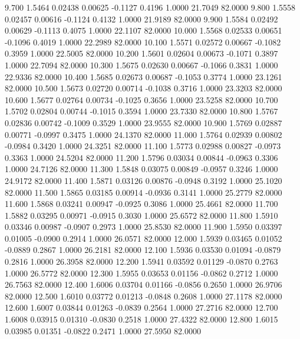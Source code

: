    9.700   1.5464   0.02438   0.00625  -0.1127   0.4196   1.0000  21.7049  82.0000
   9.800   1.5558   0.02457   0.00616  -0.1124   0.4132   1.0000  21.9189  82.0000
   9.900   1.5584   0.02492   0.00629  -0.1113   0.4075   1.0000  22.1107  82.0000
  10.000   1.5568   0.02533   0.00651  -0.1096   0.4019   1.0000  22.2989  82.0000
  10.100   1.5571   0.02572   0.00667  -0.1082   0.3959   1.0000  22.5005  82.0000
  10.200   1.5601   0.02604   0.00673  -0.1071   0.3897   1.0000  22.7094  82.0000
  10.300   1.5675   0.02630   0.00667  -0.1066   0.3831   1.0000  22.9336  82.0000
  10.400   1.5685   0.02673   0.00687  -0.1053   0.3774   1.0000  23.1261  82.0000
  10.500   1.5673   0.02720   0.00714  -0.1038   0.3716   1.0000  23.3203  82.0000
  10.600   1.5677   0.02764   0.00734  -0.1025   0.3656   1.0000  23.5258  82.0000
  10.700   1.5702   0.02804   0.00744  -0.1015   0.3594   1.0000  23.7330  82.0000
  10.800   1.5767   0.02836   0.00742  -0.1009   0.3529   1.0000  23.9555  82.0000
  10.900   1.5769   0.02887   0.00771  -0.0997   0.3475   1.0000  24.1370  82.0000
  11.000   1.5764   0.02939   0.00802  -0.0984   0.3420   1.0000  24.3251  82.0000
  11.100   1.5773   0.02988   0.00827  -0.0973   0.3363   1.0000  24.5204  82.0000
  11.200   1.5796   0.03034   0.00844  -0.0963   0.3306   1.0000  24.7126  82.0000
  11.300   1.5848   0.03075   0.00849  -0.0957   0.3246   1.0000  24.9172  82.0000
  11.400   1.5871   0.03126   0.00876  -0.0948   0.3192   1.0000  25.1020  82.0000
  11.500   1.5865   0.03185   0.00914  -0.0936   0.3141   1.0000  25.2779  82.0000
  11.600   1.5868   0.03241   0.00947  -0.0925   0.3086   1.0000  25.4661  82.0000
  11.700   1.5882   0.03295   0.00971  -0.0915   0.3030   1.0000  25.6572  82.0000
  11.800   1.5910   0.03346   0.00987  -0.0907   0.2973   1.0000  25.8530  82.0000
  11.900   1.5950   0.03397   0.01005  -0.0900   0.2914   1.0000  26.0571  82.0000
  12.000   1.5939   0.03465   0.01052  -0.0889   0.2867   1.0000  26.2181  82.0000
  12.100   1.5936   0.03530   0.01094  -0.0879   0.2816   1.0000  26.3958  82.0000
  12.200   1.5941   0.03592   0.01129  -0.0870   0.2763   1.0000  26.5772  82.0000
  12.300   1.5955   0.03653   0.01156  -0.0862   0.2712   1.0000  26.7563  82.0000
  12.400   1.6006   0.03704   0.01166  -0.0856   0.2650   1.0000  26.9706  82.0000
  12.500   1.6010   0.03772   0.01213  -0.0848   0.2608   1.0000  27.1178  82.0000
  12.600   1.6007   0.03844   0.01263  -0.0839   0.2564   1.0000  27.2716  82.0000
  12.700   1.6008   0.03915   0.01310  -0.0830   0.2518   1.0000  27.4322  82.0000
  12.800   1.6015   0.03985   0.01351  -0.0822   0.2471   1.0000  27.5950  82.0000

